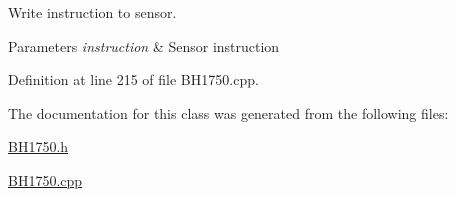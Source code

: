 Write instruction to sensor. 


\begin{DoxyParams}{Parameters}
{\em instruction} & Sensor instruction \\
\hline
\end{DoxyParams}


Definition at line 215 of file B\+H1750.\+cpp.



The documentation for this class was generated from the following files\+:\begin{DoxyCompactItemize}
\item 
\hyperlink{_b_h1750_8h}{B\+H1750.\+h}\item 
\hyperlink{_b_h1750_8cpp}{B\+H1750.\+cpp}\end{DoxyCompactItemize}
